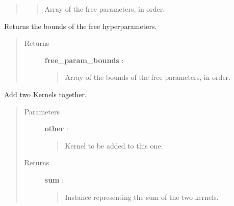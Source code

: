 \documentclass[letterpaper,10pt,english]{sphinxmanual}
\begin{document}
\begin{fulllineitems}
\begin{fulllineitems}
\begin{quote}
\begin{description}
\begin{quote}
Array of the free parameters, in order.
\end{quote}

\end{description}\end{quote}

\end{fulllineitems}


\begin{fulllineitems}
\label{gptools.kernel:gptools.kernel.core.Kernel.free_param_bounds}
Returns the bounds of the free hyperparameters.
\begin{quote}\begin{description}
\item[{Returns }] \leavevmode
\textbf{free\_param\_bounds} : 
\begin{quote}

Array of the bounds of the free parameters, in order.
\end{quote}

\end{description}\end{quote}

\end{fulllineitems}


\begin{fulllineitems}
\label{gptools.kernel:gptools.kernel.core.Kernel.__add__}
Add two Kernels together.
\begin{quote}\begin{description}
\item[{Parameters }] \leavevmode
\textbf{other} : {\hyperref[gptools.kernel:gptools.kernel.core.Kernel]{}}
\begin{quote}

Kernel to be added to this one.
\end{quote}

\item[{Returns }] \leavevmode
\textbf{sum} : {\hyperref[gptools.kernel:gptools.kernel.core.SumKernel]{}}
\begin{quote}

Instance representing the sum of the two kernels.
\end{quote}


\end{description}
\end{quote}
\end{fulllineitems}
\end{fulllineitems}
\end{document}
